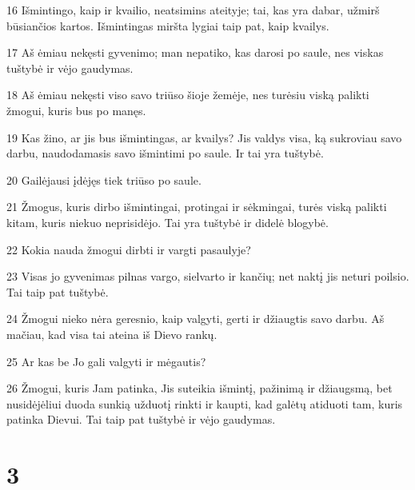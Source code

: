 \par 16 Išmintingo, kaip ir kvailio, neatsimins ateityje; tai, kas yra dabar, užmirš būsiančios kartos. Išmintingas miršta lygiai taip pat, kaip kvailys. 
\par 17 Aš ėmiau nekęsti gyvenimo; man nepatiko, kas darosi po saule, nes viskas tuštybė ir vėjo gaudymas. 
\par 18 Aš ėmiau nekęsti viso savo triūso šioje žemėje, nes turėsiu viską palikti žmogui, kuris bus po manęs. 
\par 19 Kas žino, ar jis bus išmintingas, ar kvailys? Jis valdys visa, ką sukroviau savo darbu, naudodamasis savo išmintimi po saule. Ir tai yra tuštybė. 
\par 20 Gailėjausi įdėjęs tiek triūso po saule. 
\par 21 Žmogus, kuris dirbo išmintingai, protingai ir sėkmingai, turės viską palikti kitam, kuris niekuo neprisidėjo. Tai yra tuštybė ir didelė blogybė. 
\par 22 Kokia nauda žmogui dirbti ir vargti pasaulyje? 
\par 23 Visas jo gyvenimas pilnas vargo, sielvarto ir kančių; net naktį jis neturi poilsio. Tai taip pat tuštybė. 
\par 24 Žmogui nieko nėra geresnio, kaip valgyti, gerti ir džiaugtis savo darbu. Aš mačiau, kad visa tai ateina iš Dievo rankų. 
\par 25 Ar kas be Jo gali valgyti ir mėgautis? 
\par 26 Žmogui, kuris Jam patinka, Jis suteikia išmintį, pažinimą ir džiaugsmą, bet nusidėjėliui duoda sunkią užduotį rinkti ir kaupti, kad galėtų atiduoti tam, kuris patinka Dievui. Tai taip pat tuštybė ir vėjo gaudymas.



\chapter{3}


